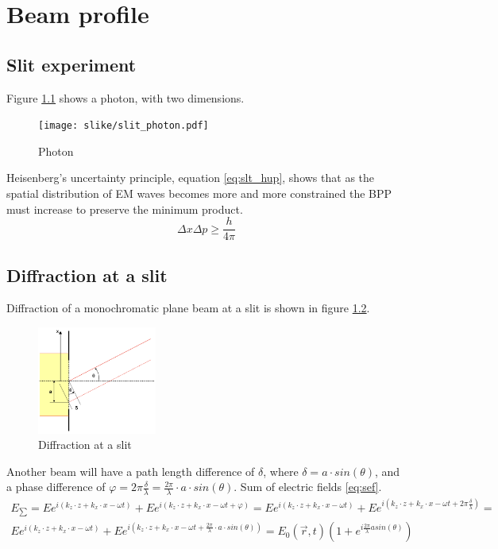\chapter{Beam profile}

\section{Slit experiment}
Figure \ref{fig:slit_photon} shows a photon, with two dimensions.
\begin{figure}[h!]
    \centering
    \texttt{[image: slike/slit\_photon.pdf]}
    \caption{Photon}
    \label{fig:slit_photon}
\end{figure}
Heisenberg's uncertainty principle, equation \ref{eq:slt_hup}, shows that as the spatial distribution of EM waves
becomes more and more constrained the BPP must increase to preserve the minimum product.
\begin{equation}
    \Delta x \Delta p \ge \frac{h}{4 \pi}
    \label{eq:slt_hup}
\end{equation}

\section{Diffraction at a slit}
Diffraction of a monochromatic plane beam at a slit is shown in figure \ref{fig:slit1}.
\begin{figure}[h!]
    \centering
    \includegraphics[width=0.35\textwidth]{slike/slit1.png}
    \caption{Diffraction at a slit}
    \label{fig:slit1}
\end{figure}
Another beam will have a path length difference of $\delta$, where $\delta = a \cdot sin(\theta)$, and a phase difference
of $\varphi = 2 \pi \frac{\delta}{\lambda} = \frac{2 \pi}{\lambda} \cdot a \cdot sin(\theta)$.
Sum of electric fields \ref{eq:sef}.
\begin{equation}
    \begin{aligned}
    E_{\sum} = E e^{i(k_z \cdot z + k_x \cdot x - \omega t)} + E e^{i(k_z \cdot z + k_x \cdot x - \omega t + \varphi)} =
    E e^{i(k_z \cdot z + k_x \cdot x - \omega t)} + E e^{i(k_z \cdot z + k_x \cdot x - \omega t + 2\pi \frac{\delta}{\lambda})} = \\
    E e^{i(k_z \cdot z + k_x \cdot x - \omega t)} + E e^{i(k_z \cdot z + k_x \cdot x - \omega t + \frac{2 \pi}{\lambda} \cdot a \cdot sin(\theta))} =  E_0(\vec{r},t) (1 + e^{i \frac{2\pi}{\lambda}a sin(\theta)}) 
    \end{aligned}
    \label{eq:sef}
\end{equation}

